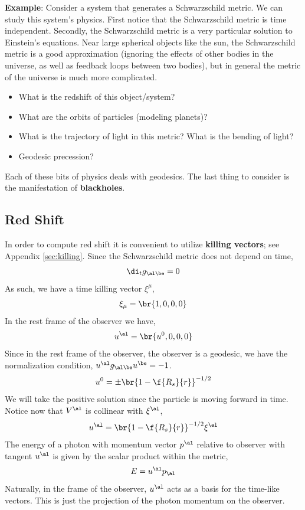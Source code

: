 \documentclass{article}
\begin{document}
\textbf{Example}: Consider a system that generates a Schwarzschild metric. We can study this system's physics. First notice that the Schwarzschild metric is time independent. Secondly, the Schwarzschild metric is a very particular solution to Einstein's equations. Near large spherical objects like the sun, the Schwarzschild metric is a good approximation (ignoring the effects of other bodies in the universe, as well as feedback loops between two bodies), but in general the metric of the universe is much more complicated.

\begin{itemize}
    \item What is the redshift of this object/system?
    \item What are the orbits of particles (modeling planets)?
    \item What is the trajectory of light in this metric? What is the bending of light?
    \item Geodesic precession?
\end{itemize}

Each of these bits of physics deals with geodesics. The last thing to consider is the manifestation of \textbf{blackholes}.

\subsection{Red Shift}

In order to compute red shift it is convenient to utilize \textbf{killing vectors}; see Appendix \ref{sec:killing}. Since the Schwarzschild metric does not depend on time,
\[ \di_t g_{\al\be} = 0 \]
As such, we have a time killing vector $\xi^\mu$,
\[ \xi_\mu = \br{1,0,0,0} \]
In the rest frame of the observer we have,
\[ u^\al = \br{u^0, 0, 0, 0} \]
Since in the rest frame of the observer, the observer is a geodesic, we have the normalization condition, $u^\al g_{\al\be} u^\be = -1$.
\[ u^0 = \pm \br{1 - \f{R_s}{r}}^{-1/2} \]
We will take the positive solution since the particle is moving forward in time. Notice now that $V^\al$ is collinear with $\xi^\al$,
\[ u^\al = \br{1- \f{R_s}{r}}^{-1/2} \xi^\al \]
The energy of a photon with momentum vector $p^\al$ relative to observer with tangent $u^\al$ is given by the scalar product within the metric,
\[ E = u^\al p_\al \]
Naturally, in the frame of the observer, $u^\al$ acts as a basis for the time-like vectors. This is just the projection of the photon momentum on the observer.\\
\end{document}
